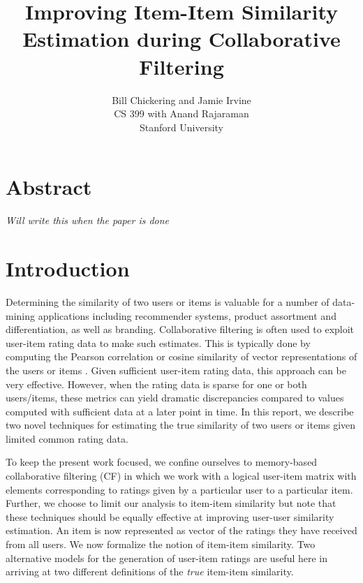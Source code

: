 \documentclass[11pt]{article}
\begin{document}

\title{Improving Item-Item Similarity Estimation during Collaborative Filtering}
\author{Bill Chickering and Jamie Irvine\\
CS 399 with Anand Rajaraman\\
Stanford University}
\renewcommand{\today}{March 25, 2014}
\maketitle

\section*{Abstract}
\emph{Will write this when the paper is done}

\section*{Introduction}
Determining the similarity of two users or items is valuable for a
number of data-mining applications including recommender systems, product
assortment and differentiation, as well as branding. Collaborative filtering is
often used to exploit user-item rating data to make such estimates. This is 
typically done by computing the Pearson correlation or cosine similarity of 
vector representations of the users or items \cite{Su2009}. Given sufficient 
user-item rating data, this approach can be very effective. However, when the
rating data is sparse for one or both users/items, these metrics can
yield dramatic discrepancies compared to values computed with sufficient
data at a later point in time. In this report, we describe two novel techniques 
for estimating the true similarity of two users or items given limited common 
rating data.

To keep the present work focused, we confine ourselves to memory-based
collaborative filtering (CF) in which we work with a logical user-item matrix
with elements corresponding to ratings given by a particular user to a
particular item. Further, we choose to limit our analysis to item-item
similarity but note that these techniques should be equally effective at
improving user-user similarity estimation. An item is now represented as vector
of the ratings they have received from all users. We now formalize the notion of
item-item similarity. Two alternative models for the generation of user-item
ratings are useful here in arriving at two different definitions of the {\em
true} item-item similarity.
\end{document}
